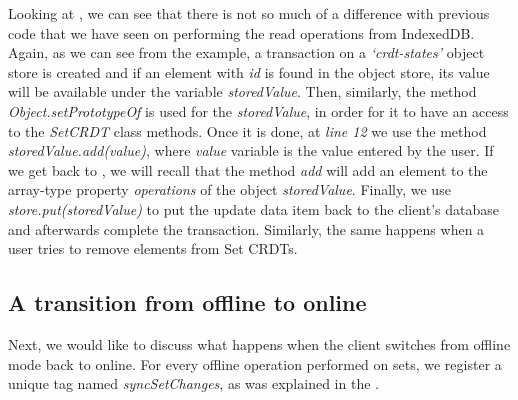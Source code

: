 Looking at , we can see that there is not so much of a difference with previous code that we have seen on performing the read operations from IndexedDB. Again, as we can see from the example, a transaction on a \textit{`crdt-states'} object store is created and if an element with \textit{id} is found in the object store, its value will be available under the variable \textit{storedValue}. Then, similarly, the method \textit{Object.setPrototypeOf} is used for the \textit{storedValue}, in order for it to have an access to the \textit{SetCRDT} class methods. Once it is done, at \textit{line 12} we use the method \textit{storedValue.add(value)}, where \textit{value} variable is the value entered by the user. If we get back to , we will recall that the method \textit{add} will add an element to the array-type property \textit{operations} of the object \textit{storedValue}. Finally, we use \textit{store.put(storedValue)} to put the update data item back to the client's database and afterwards complete the transaction. Similarly, the same happens when a user tries to remove elements from Set CRDTs.

\subsection*{A transition from offline to online}

Next, we would like to discuss what happens when the client switches from offline mode back to online. For every offline operation performed on sets, we register a unique tag named \textit{syncSetChanges}, as was explained in the .

